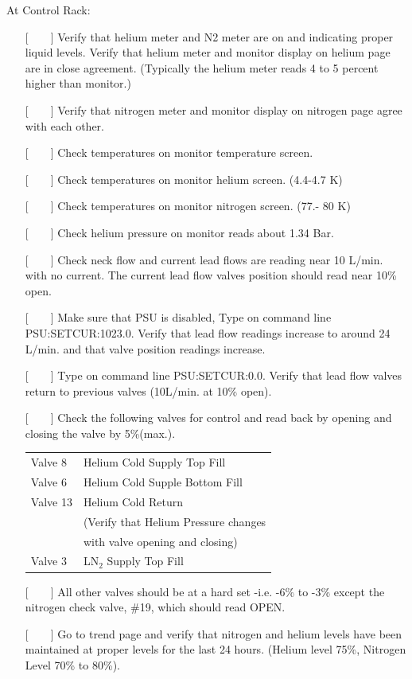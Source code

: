 \noindent At Control Rack:

\begin{itemize}
\item[{[~~~~]}]{Verify that helium meter and N2 meter are on and indicating
proper liquid levels. Verify that helium meter and monitor display on helium
page are in close agreement.  (Typically the helium meter reads 4 to 5 percent
higher than monitor.)}
\item[{[~~~~]}]{Verify that nitrogen meter and monitor display on nitrogen
page agree with each other.}
\item[{[~~~~]}]{Check temperatures on monitor temperature screen.}
\item[{[~~~~]}]{Check temperatures on monitor helium screen. (4.4-4.7 K)}
\item[{[~~~~]}]{Check temperatures on monitor nitrogen screen. (77.- 80 K)}
\item[{[~~~~]}]{Check helium pressure on monitor reads about 1.34 Bar.}
\item[{[~~~~]}]{Check neck flow and current lead flows are reading near 10
L/min. with no current.  The current lead flow valves position should read
near 10\% open.}
\item[{[~~~~]}]{Make sure that PSU is disabled, Type on command line
PSU:SETCUR:1023.0.  Verify that lead flow readings increase to around 24
L/min. and that valve position readings increase.}
\item[{[~~~~]}]{Type on command line PSU:SETCUR:0.0. Verify that lead flow
valves return to previous valves (10L/min. at 10\% open).}
\item[{[~~~~]}]{Check the following valves for control and read back by opening
and closing the valve by 5\%(max.).}

\begin{center}
  \begin{tabular}{ll}
Valve 8	& Helium Cold Supply Top Fill		\\
Valve 6	& Helium Cold Supple Bottom Fill	\\
Valve 13& Helium Cold Return			\\
	& (Verify that Helium Pressure changes  \\
        &  with valve opening and closing)      \\
Valve 3	& LN$_2$ Supply Top Fill		\\
  \end{tabular}
\end{center}
\item[{[~~~~]}]{All other valves should be at a hard set -i.e. -6\% to
-3\% except the nitrogen check valve, \#19, which should read OPEN.}
\item[{[~~~~]}]{Go to trend page and verify that nitrogen and helium levels
have been maintained at proper levels for the last 24
hours.  (Helium level 75\%, Nitrogen Level 70\% to 80\%).}
\end{itemize}



